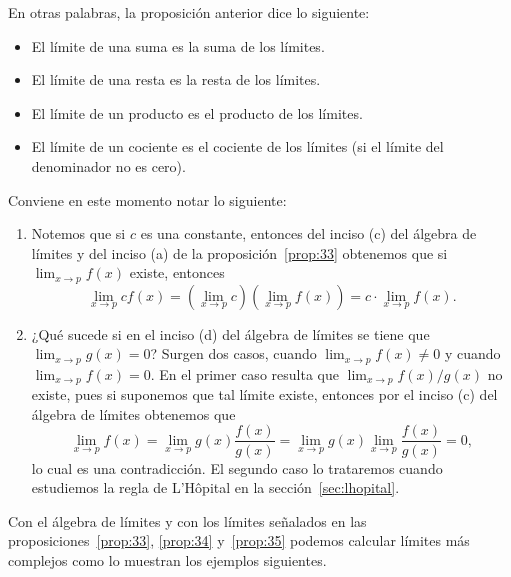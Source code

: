 \documentclass[12pt,a4paper]{book}
\begin{document}
    En otras palabras, la proposición anterior dice lo siguiente:
    \begin{itemize}[nosep,label=$\blacksquare$]
        \item El límite de una suma es la suma de los límites.
        \item El límite de una resta es la resta de los límites.
        \item El límite de un producto es el producto de los límites.
        \item El límite de un cociente es el cociente de los límites (si el límite del
        denominador no es cero).
    \end{itemize}

    \begin{observacion}\label{obs:10}
        Conviene en este momento notar lo siguiente:
        \begin{enumerate}
            \item Notemos que si $c$ es una constante, entonces del inciso (c) del álgebra de
            límites y del inciso (a) de la proposición~\ref{prop:33} obtenemos que si $\lim_{x\to p}f(x)$
            existe, entonces
            \begin{equation*}
                \lim_{x\to p}cf(x)=\left(\lim_{x\to p}c\right)\left(\lim_{x\to p}f(x)\right)=c\cdot\lim_{x\to p}f(x).
            \end{equation*}
            \item ¿Qué sucede si en el inciso (d) del álgebra de límites se tiene que
            $\lim_{x\to p}g(x)=0$? Surgen dos casos, cuando $\lim_{x\to p}f(x)\neq 0$ y cuando
            $\lim_{x\to p}f(x)=0$. En el primer caso resulta que $\lim_{x\to p}f(x)/g(x)$ no
            existe, pues si suponemos que tal límite existe, entonces por el inciso (c)
            del álgebra de límites obtenemos que
            \begin{equation*}
                \lim_{x\to p}f(x)=\lim_{x\to p}g(x)\frac{f(x)}{g(x)}=\lim_{x\to p}g(x)\lim_{x\to p}\frac{f(x)}{g(x)}=0,
            \end{equation*}
            lo cual es una contradicción. El segundo caso lo trataremos cuando estudiemos
            la regla de L'Hôpital en la sección~\ref{sec:lhopital}.
        \end{enumerate}
    \end{observacion}

    Con el álgebra de límites y con los límites señalados en las proposiciones~\ref{prop:33},
    \ref{prop:34} y~\ref{prop:35} podemos calcular límites más complejos como lo muestran los
    ejemplos siguientes.
\end{document}
